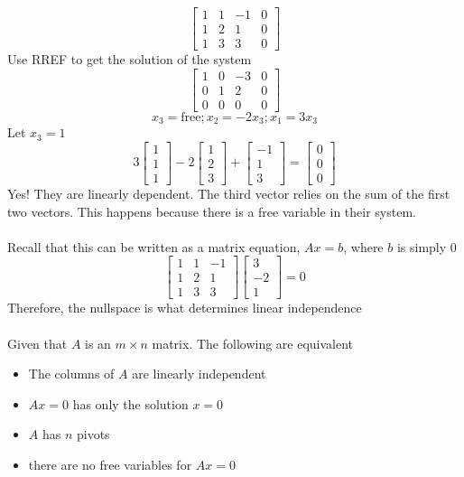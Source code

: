 \[
  \left[
    \begin{array}{ccc|c}
      1 & 1 & -1 & 0 \\
      1 & 2 & 1 & 0 \\
      1 & 3 & 3 & 0
    \end{array}
  \right] 
\] Use RREF to get the solution of the system 
\[
  \left[
    \begin{array}{ccc|c}
      1 & 0 & -3 & 0 \\
      0 & 1 & 2 & 0 \\
      0 & 0 & 0 & 0
    \end{array}
  \right]
\]
\[
  x_3 = \text{free}; x_2 = -2x_3; x_1 = 3x_3
\]
Let $x_3 = 1$ 
\[
  3\begin{bmatrix} 1 \\ 1 \\ 1 \end{bmatrix} - 2 \begin{bmatrix}1 \\ 2 \\ 3\end{bmatrix} + 
  \begin{bmatrix} -1 \\ 1 \\ 3 \end{bmatrix} = \begin{bmatrix} 0 \\ 0 \\ 0 \end{bmatrix}
\]
Yes! They are linearly dependent. The third vector relies on the sum of the first two 
vectors. This happens because there is a free variable in their system. \\\\
Recall that this can be written as a matrix equation, $Ax = b$, where $b$ is simply $0$ 
\[
  \begin{bmatrix}
    1 & 1 & -1 \\
    1 & 2 & 1 \\
    1 & 3 & 3
  \end{bmatrix} \begin{bmatrix}
3 \\ -2 \\ 1 \end{bmatrix} = 0
\] Therefore, the nullspace is what determines linear independence \\\\
Given that $A$ is an $m \times n$ matrix. The following are equivalent 
\begin{itemize}
  \item The columns of $A$ are linearly independent 
  \item $Ax = 0$ has only the solution $x = 0$ 
  \item $A$ has $n$ pivots 
  \item there are no free variables for $Ax = 0$ 
\end{itemize}
